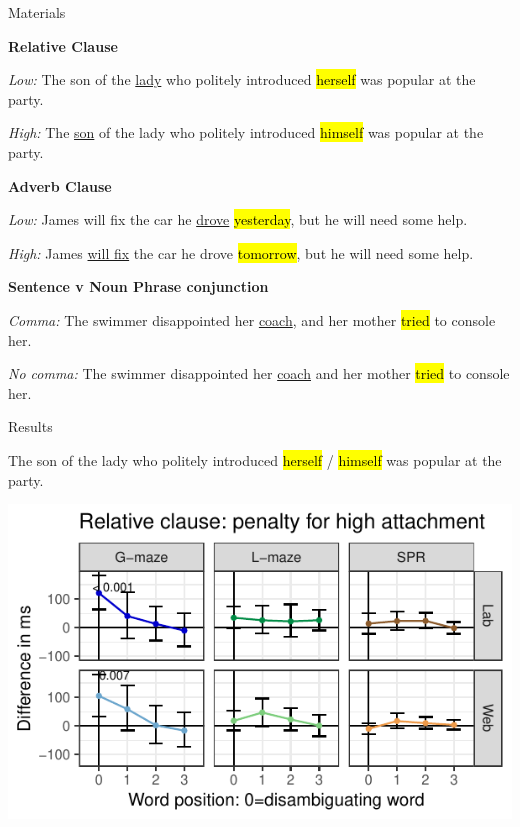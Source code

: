 \documentclass[ 12pt, xcolor=beamer,table,usenames,dvipsnames, ignorenonframetext, ngerman]{beamer}
\makeatletter
\let\HL\hl
\renewcommand\hl{%
	\let\set@color\beamerorig@set@color
	\let\reset@color\beamerorig@reset@color
	\HL}
\makeatother
\begin{document}
\begin{frame}{Materials}

\textbf{Relative Clause}

\textit{Low:} The son of the \uline{lady} who politely introduced \hl{herself} was popular at the party.

 \textit{High:} The \uline{son} of the lady who politely introduced \hl{himself} was popular at the party.
 

\textbf{Adverb Clause}

\textit{Low:} James will fix the car he \uline{drove} \hl{yesterday}, but he will need some help.

 \textit{High:} James \uline{will fix} the car he drove \hl{tomorrow}, but he will need some help.
		
\textbf{Sentence v Noun Phrase conjunction}

 \textit{Comma:} The swimmer disappointed her \uline{coach}, and her mother \hl{tried} to console her.

\textit{No comma:} The swimmer disappointed her \uline{coach} and her mother \hl{tried} to console her.
\end{frame}

\begin{frame}{Results}
\begin{small}	
The son of the lady who politely introduced \hl{herself} / \hl{himself} was popular at the party.
	
\end{small}
\includegraphics[width=\textwidth]{../Images/g_rel.pdf}
\end{frame}
\end{document}
